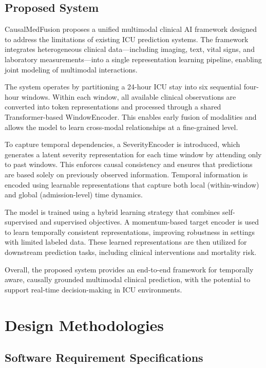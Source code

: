 \documentclass{fisatprojectfinal}
\begin{document}
\section{Proposed System}
CausalMedFusion proposes a unified multimodal clinical AI framework designed to address the limitations of existing ICU prediction systems. The framework integrates heterogeneous clinical data—including imaging, text, vital signs, and laboratory measurements—into a single representation learning pipeline, enabling joint modeling of multimodal interactions.

The system operates by partitioning a 24-hour ICU stay into six sequential four-hour windows. Within each window, all available clinical observations are converted into token representations and processed through a shared Transformer-based WindowEncoder. This enables early fusion of modalities and allows the model to learn cross-modal relationships at a fine-grained level.

To capture temporal dependencies, a SeverityEncoder is introduced, which generates a latent severity representation for each time window by attending only to past windows. This enforces causal consistency and ensures that predictions are based solely on previously observed information. Temporal information is encoded using learnable representations that capture both local (within-window) and global (admission-level) time dynamics.

The model is trained using a hybrid learning strategy that combines self-supervised and supervised objectives. A momentum-based target encoder is used to learn temporally consistent representations, improving robustness in settings with limited labeled data. These learned representations are then utilized for downstream prediction tasks, including clinical interventions and mortality risk.

Overall, the proposed system provides an end-to-end framework for temporally aware, causally grounded multimodal clinical prediction, with the potential to support real-time decision-making in ICU environments.

\chapter{Design Methodologies}

\section{Software Requirement Specifications}
\end{document}
